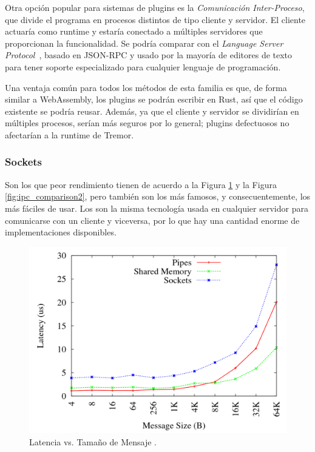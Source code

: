 Otra opción popular para sistemas de plugins es la \emph{Comunicación
Inter-Proceso}, que divide el programa en procesos distintos de tipo cliente y
servidor. El cliente actuaría como runtime y estaría conectado a múltiples
servidores que proporcionan la funcionalidad. Se podría comparar con el
\emph{Language Server Protocol}~\cite{lsp}, basado en JSON-RPC y usado por la
mayoría de editores de texto para tener soporte especializado para cualquier
lenguaje de programación.

Una ventaja común para todos los métodos de esta familia es que, de forma
similar a WebAssembly, los plugins se podrán escribir en Rust, así que el código
existente se podría reusar. Además, ya que el cliente y servidor se dividirían
en múltiples procesos, serían más seguros por lo general; plugins defectuosos no
afectarían a la runtime de Tremor.

\subsubsection{Sockets}

Son los que peor rendimiento tienen de acuerdo a la Figura
\ref{fig:ipc_comparison1} y la Figura \ref{fig:ipc_comparison2}, pero también
son los más famosos, y consecuentemente, los más fáciles de usar. Los \sockets
son la misma tecnología usada en cualquier servidor para comunicarse con un
cliente y viceversa, por lo que hay una cantidad enorme de implementaciones
disponibles.

\begin{figure}
    \centering
    \includegraphics[width=12cm]{./Imagenes/venkataraman2015evaluation1.png}
    \caption{Latencia vs. Tamaño de Mensaje \cite{venkataraman2015evaluation}.}%
    \label{fig:ipc_comparison1}
\end{figure}

